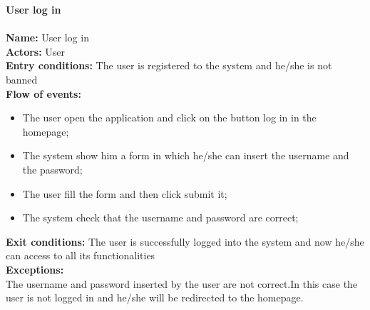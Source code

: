 \textbf{User log in} \\
\\
\textbf{Name:} User log in \\
\textbf{Actors:} User \\
\textbf{Entry conditions:} The user is registered to the system and he/she is not banned\\
\textbf{Flow of events:}
\begin{itemize}
\item The user open the application and click on the button log in in the homepage;
\item The system show him a form in which he/she can insert the username and the password;
\item The user fill the form and then click submit it;
\item The system check that the username and password are correct;
\end{itemize}
\textbf{Exit conditions:} The user is successfully logged into the system and now he/she can access to all its functionalities \\
\textbf{Exceptions:} \\
The username and password inserted by the user are not correct.In this case the user is not logged in and he/she will be redirected to the homepage.\\

